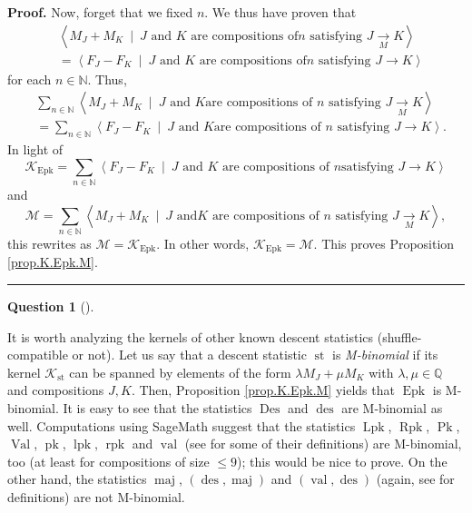 \documentclass[numbers=enddot,12pt,final,onecolumn,notitlepage]{scrartcl}%
\theoremstyle{definition}
\newtheorem{quest}[theo]{Question}
\newenvironment{question}[1][]
{\begin{quest}[#1]\begin{leftbar}}
{\end{leftbar}\end{quest}}
\newenvironment{proof}[1][Proof]{\noindent\textbf{#1.} }{\ \rule{0.5em}{0.5em}}
\newenvironment{question}[1][Question]{\noindent\textbf{#1.} }{\ \rule{0.5em}{0.5em}}
\newenvironment{verlong}{}{}
\let\sumnonlimits\sum
\renewcommand{\sum}{\sumnonlimits\limits}
\begin{document}
\begin{verlong}
\begin{proof}
Now, forget that we fixed $n$. We thus have proven that
\begin{align*}
&  \left\langle M_{J}+M_{K}\ \mid\ J\text{ and }K\text{ are compositions of
}n\text{ satisfying }J\underset{M}{\rightarrow}K\right\rangle \\
&  =\left\langle F_{J}-F_{K}\ \mid\ J\text{ and }K\text{ are compositions of
}n\text{ satisfying }J\rightarrow K\right\rangle
\end{align*}
for each $n\in\mathbb{N}$. Thus,%
\begin{align*}
&  \sum_{n\in\mathbb{N}}\left\langle M_{J}+M_{K}\ \mid\ J\text{ and }K\text{
are compositions of }n\text{ satisfying }J\underset{M}{\rightarrow
}K\right\rangle \\
&  =\sum_{n\in\mathbb{N}}\left\langle F_{J}-F_{K}\ \mid\ J\text{ and }K\text{
are compositions of }n\text{ satisfying }J\rightarrow K\right\rangle .
\end{align*}
In light of%
\[
\mathcal{K}_{\operatorname*{Epk}}=\sum_{n\in\mathbb{N}}\left\langle
F_{J}-F_{K}\ \mid\ J\text{ and }K\text{ are compositions of }n\text{
satisfying }J\rightarrow K\right\rangle
\]
and%
\[
\mathcal{M}=\sum_{n\in\mathbb{N}}\left\langle M_{J}+M_{K}\ \mid\ J\text{ and
}K\text{ are compositions of }n\text{ satisfying }J\underset{M}{\rightarrow
}K\right\rangle ,
\]
this rewrites as $\mathcal{M}=\mathcal{K}_{\operatorname*{Epk}}$. In other
words, $\mathcal{K}_{\operatorname*{Epk}}=\mathcal{M}$. This proves
Proposition \ref{prop.K.Epk.M}.
\end{proof}
\end{verlong}

\begin{question}
It is worth analyzing the kernels of other known descent statistics
(shuffle-compatible or not).
Let us say that a descent statistic $\operatorname{st}$ is
\textit{M-binomial}
if its kernel $\mathcal{K}_{\operatorname{st}}$ can be spanned by
elements of the form $\lambda M_{J}+\mu M_{K}$ with
$\lambda, \mu \in \mathbb{Q}$ and compositions $J,K$.
Then, Proposition \ref{prop.K.Epk.M} yields that $\operatorname{Epk}$
is M-binomial.
It is easy to see that the statistics $\operatorname{Des}$ and
$\operatorname{des}$ are M-binomial as well.
Computations using SageMath suggest that the statistics
$\operatorname{Lpk}$, $\operatorname{Rpk}$, $\operatorname{Pk}$,
$\operatorname{Val}$,
$\operatorname{pk}$, $\operatorname{lpk}$, $\operatorname{rpk}$
and $\operatorname{val}$
(see \cite{part1} for some of their definitions) are M-binomial, too
(at least for compositions of size $\leq 9$);
this would be nice to prove.
On the other hand, the statistics
$\operatorname{maj}$, $\left(\operatorname{des},\operatorname{maj}\right)$
and $\left(\operatorname{val},\operatorname{des}\right)$ (again, see
\cite{part1} for definitions) are not M-binomial.
\end{question}
\end{document}
